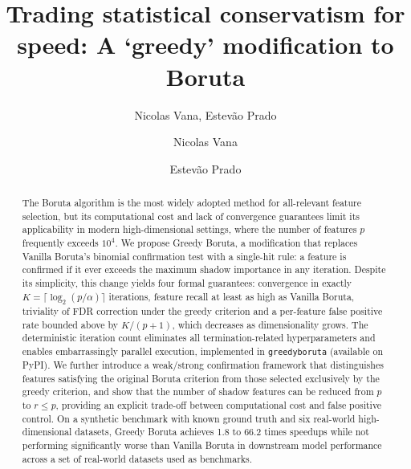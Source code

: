 \documentclass[runningheads]{llncs}
\begin{document}
\title{Trading statistical conservatism for speed: A `greedy' modification to Boruta}


\author{Nicolas Vana, Estevão Prado}

\author{Nicolas Vana \and Estevão Prado}

\maketitle


\begin{abstract}
The Boruta algorithm is the most widely adopted method for all-relevant feature selection, but its computational cost and lack of convergence guarantees limit its applicability in modern high-dimensional settings, where the number of features $p$ frequently exceeds $10^4$. We propose Greedy Boruta, a modification that replaces Vanilla Boruta's binomial confirmation test with a single-hit rule: a feature is confirmed if it ever exceeds the maximum shadow importance in any iteration. Despite its simplicity, this change yields four formal guarantees: convergence in exactly $K = \lceil \log_2(p/\alpha) \rceil$ iterations, feature recall at least as high as Vanilla Boruta, triviality of FDR correction under the greedy criterion and a per-feature false positive rate bounded above by $K/(p+1)$, which decreases as dimensionality grows. The deterministic iteration count eliminates all termination-related hyperparameters and enables embarrassingly parallel execution, implemented in \texttt{greedyboruta} (available on PyPI). We further introduce a weak/strong confirmation framework that distinguishes features satisfying the original Boruta criterion from those selected exclusively by the greedy criterion, and show that the number of shadow features can be reduced from $p$ to $r \leq p$, providing an explicit trade-off between computational cost and false positive control. On a synthetic benchmark with known ground truth and six real-world high-dimensional datasets, Greedy Boruta achieves 1.8 to 66.2 times speedups while not performing significantly worse than Vanilla Boruta in downstream model performance across a set of real-world datasets used as benchmarks.
\end{abstract}
\end{document}
